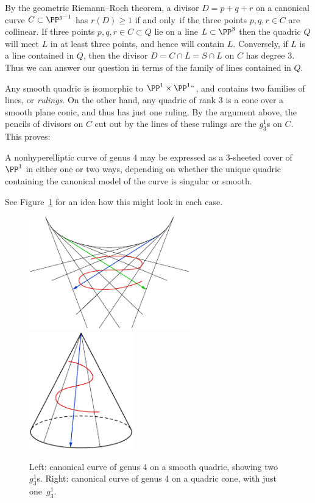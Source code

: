 By the
geometric Riemann--Roch theorem,
%
a divisor $D = p+q+r$ on a canonical curve $C \subset \PP^{g-1}$ has
$r(D) \geq 1$ if and only~if the three points $p,q,r \in C$ are
collinear. If three points $p,q,r \in C \subset Q$ lie on a line $L
\subset \PP^3$ then the quadric $Q$ will meet $L$ in at least three
points, and hence will contain $L$. Conversely,  if $L$ is a line
contained in $Q$, then the divisor $D = C \cap L = S \cap L$ on $C$
has degree  3. Thus we can answer our question in terms of the family
of lines contained in $Q$.

Any smooth quadric is isomorphic to $\PP^1\times \PP^1` `$, and
contains two families of lines, or
%
\emph{rulings}.
On the other hand,
any  quadric of rank 3 is a
cone
%
over a smooth plane conic, and thus
has just one ruling. By the argument above, the pencils of divisors on
$C$ cut out by the lines of these rulings are the $g^1_3$s on $C$.
This proves:

\begin{proposition}\label{genus 4 trigonal}
A nonhyperelliptic curve of genus $4$ may be expressed as a
$3$-sheeted cover of $\PP^1$ in either one or two ways, depending on
whether the unique quadric containing the canonical model of the curve
is singular or smooth.
\unif
\end{proposition}

See Figure~\ref{Fig8.1} for an idea how this might look in
each case.

\begin{figure}
\centerline{\hbox{\includegraphics[height=1.93in]{main/Fig08-1}}\hfil
\includegraphics[height=2in]{main/Fig08-2}\quad}
\caption{Left: canonical curve of genus 4 on a smooth quadric, showing
  two $g^{1}_3$s.  Right: canonical curve of genus 4 on a quadric
  cone, with just one~$g^{1}_{3}$.}
\label{Fig8.1}
\end{figure}

